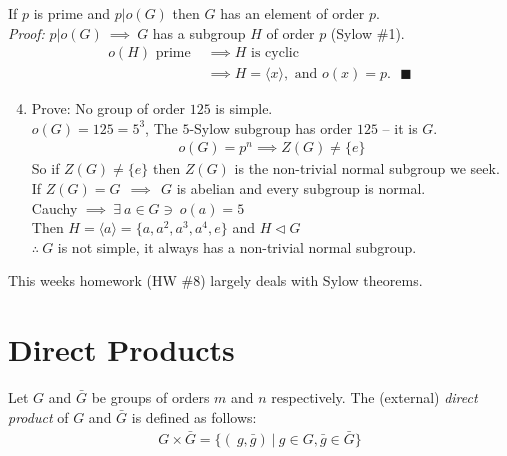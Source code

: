 \setcounter{dummy}{2}
\setcounter{section}{11}
\begin{theorem}
If $p$ is prime and $p|o(G)$ then $G$ has an element of order $p$. \steezybreak\\
\noindent \textit{Proof:} $p|o(G) \ \implies \ G$ has a subgroup $H$ of order $p$ (Sylow \#1). 
\begin{align}
    o(H) \text{ prime }&\implies H \text{ is cyclic }\nonumber \\
    &\implies H=\langle x \rangle, \text{ and }o(x) = p. \ \ \ \blacksquare \nonumber
\end{align}
\end{theorem}
\setcounter{dummy}{2}
\setcounter{section}{12}


\begin{enumerate}
\setcounter{enumi}{3}
    \item Prove: No group of order $125$ is simple. \steezybreak\\ 
    $o(G)=125=5^3$, The $5$-Sylow subgroup has order $125$ -- it is $G$.
    \begin{align}
        o(G)=p^n \implies Z(G)\neq \{e\} \nonumber
    \end{align}
    So if $Z(G)\neq \{e\}$ then $Z(G)$ is the non-trivial normal subgroup we seek. \\
    If $Z(G)=G \ \ \implies \ \ G$ is abelian and every subgroup is normal. \\
    Cauchy $\implies \ \exists \ a\in G \ni \ o(a)=5$ \\
    Then $H=\langle a \rangle = \{a,a^2,a^3,a^4,e\}$ and $H\triangleleft G$ \\
    $\therefore \ G$ is not simple, it always has a non-trivial normal subgroup.
\end{enumerate}
This weeks homework (HW \#8) largely deals with Sylow theorems.

\section{Direct Products}

\begin{definition}
Let $G$ and $\bar{G}$ be groups of orders $m$ and $n$ respectively. The (external) \textit{direct product} of $G$ and $\bar{G}$ is defined as follows:
\begin{align}
    G\times \bar{G} = \{(\ g,\bar{g}) \  | \ g\in G, \bar{g}\in \bar{G}\} \nonumber
\end{align}
\end{definition}

